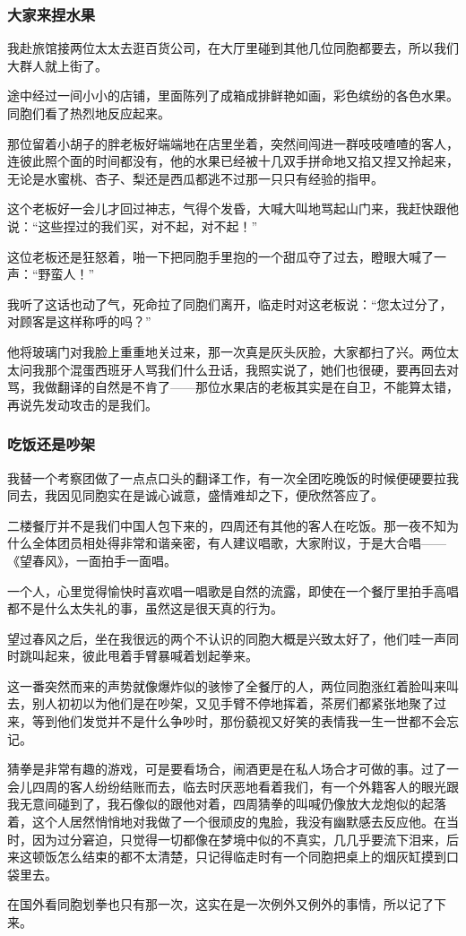 \subsubsection*{大家来捏水果}
\par 我赴旅馆接两位太太去逛百货公司，在大厅里碰到其他几位同胞都要去，所以我们大群人就上街了。
\par 途中经过一间小小的店铺，里面陈列了成箱成排鲜艳如画，彩色缤纷的各色水果。同胞们看了热烈地反应起来。
\par 那位留着小胡子的胖老板好端端地在店里坐着，突然间闯进一群吱吱喳喳的客人，连彼此照个面的时间都没有，他的水果已经被十几双手拼命地又掐又捏又拎起来，无论是水蜜桃、杏子、梨还是西瓜都逃不过那一只只有经验的指甲。
\par 这个老板好一会儿才回过神志，气得个发昏，大喊大叫地骂起山门来，我赶快跟他说：“这些捏过的我们买，对不起，对不起！”
\par 这位老板还是狂怒着，啪一下把同胞手里抱的一个甜瓜夺了过去，瞪眼大喊了一声：“野蛮人！”
\par 我听了这话也动了气，死命拉了同胞们离开，临走时对这老板说：“您太过分了，对顾客是这样称呼的吗？”
\par 他将玻璃门对我脸上重重地关过来，那一次真是灰头灰脸，大家都扫了兴。两位太太问我那个混蛋西班牙人骂我们什么丑话，我照实说了，她们也很硬，要再回去对骂，我做翻译的自然是不肯了——那位水果店的老板其实是在自卫，不能算太错，再说先发动攻击的是我们。
\subsubsection*{吃饭还是吵架}
\par 我替一个考察团做了一点点口头的翻译工作，有一次全团吃晚饭的时候便硬要拉我同去，我因见同胞实在是诚心诚意，盛情难却之下，便欣然答应了。
\par 二楼餐厅并不是我们中国人包下来的，四周还有其他的客人在吃饭。那一夜不知为什么全体团员相处得非常和谐亲密，有人建议唱歌，大家附议，于是大合唱——《望春风》，一面拍手一面唱。
\par 一个人，心里觉得愉快时喜欢唱一唱歌是自然的流露，即使在一个餐厅里拍手高唱都不是什么太失礼的事，虽然这是很天真的行为。
\par 望过春风之后，坐在我很远的两个不认识的同胞大概是兴致太好了，他们哇一声同时跳叫起来，彼此甩着手臂暴喊着划起拳来。
\par 这一番突然而来的声势就像爆炸似的骇惨了全餐厅的人，两位同胞涨红着脸叫来叫去，别人初初以为他们是在吵架，又见手臂不停地挥着，茶房们都紧张地聚了过来，等到他们发觉并不是什么争吵时，那份藐视又好笑的表情我一生一世都不会忘记。
\par 猜拳是非常有趣的游戏，可是要看场合，闹酒更是在私人场合才可做的事。过了一会儿四周的客人纷纷结账而去，临去时厌恶地看着我们，有一个外籍客人的眼光跟我无意间碰到了，我石像似的跟他对着，四周猜拳的叫喊仍像放大龙炮似的起落着，这个人居然悄悄地对我做了一个很顽皮的鬼脸，我没有幽默感去反应他。在当时，因为过分窘迫，只觉得一切都像在梦境中似的不真实，几几乎要流下泪来，后来这顿饭怎么结束的都不太清楚，只记得临走时有一个同胞把桌上的烟灰缸摸到口袋里去。
\par 在国外看同胞划拳也只有那一次，这实在是一次例外又例外的事情，所以记了下来。

